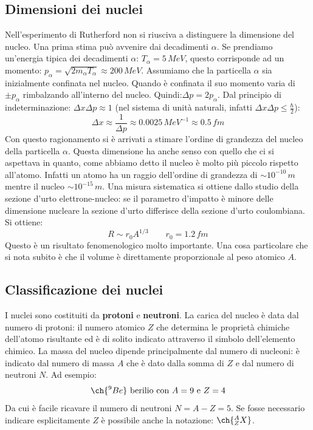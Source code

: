 \subsection{Dimensioni dei nuclei}
Nell'esperimento di Rutherford non si riusciva a distinguere la dimensione del nucleo. Una prima stima può avvenire dai decadimenti $\alpha$. Se prendiamo un'energia tipica dei decadimenti $\alpha$: $T_\alpha=5\,MeV$, questo corrisponde ad un momento: $p_\alpha=\sqrt{2m_\alpha T_\alpha}\approx 200\,MeV$. Assumiamo che la particella $\alpha$ sia inizialmente confinata nel nucleo. Quando è confinata il suo momento varia di $\pm p_\alpha$ rimbalzando all'interno del nucleo. Quindi:$\Delta p = 2p_\alpha$. Dal principio di indeterminazione: $\Delta x\Delta p\approx 1$ (nel sistema di unità naturali, infatti $\Delta x\Delta p\le\frac{\hbar}{2}$):
\begin{equation*}
    \Delta x \approx \frac{1}{\Delta p}\approx 0.0025\,MeV^{-1} \approx 0.5\,fm
\end{equation*}
Con questo ragionamento si è arrivati a stimare l'ordine di grandezza del nucleo della particella $\alpha$. Questa dimensione ha anche senso con quello che ci si aspettava in quanto, come abbiamo detto il nucleo è molto più piccolo rispetto all'atomo. Infatti un atomo ha un raggio dell'ordine di grandezza di $\sim10^{-10}\, m$ mentre il nucleo $\sim10^{-15}\,m$. Una misura sistematica si ottiene dallo studio della sezione d'urto elettrone-nucleo: se il parametro d'impatto è minore delle dimensione nucleare la sezione d'urto differisce della sezione d'urto coulombiana. Si ottiene: 
\begin{equation*}
    R\sim r_0A^{1/3}\qquad r_0=1.2\,fm 
\end{equation*}
Questo è un risultato fenomenologico molto importante. Una cosa particolare che si nota subito è che il volume è direttamente proporzionale al peso atomico $A$.
\subsection{Classificazione dei nuclei}
I nuclei sono costituiti da \textbf{protoni} e \textbf{neutroni}. La carica del nucleo è data dal numero di protoni: il numero atomico $Z$ che determina le proprietà chimiche dell'atomo risultante ed è di solito indicato attraverso il simbolo dell'elemento chimico. La massa del nucleo dipende principalmente dal numero di nucleoni: è indicato dal numero di massa $A$ che è dato dalla somma di $Z$ e dal numero di neutroni $N$. Ad esempio:
\begin{equation*}
    \ch{^9Be} \text{  berilio con } A=9 \text{ e } Z=4
\end{equation*}
Da cui è facile ricavare il numero di neutroni $N=A-Z=5$. Se fosse necessario indicare esplicitamente $Z$ è possibile anche la notazione: $\ch{^A_ZX}$.

